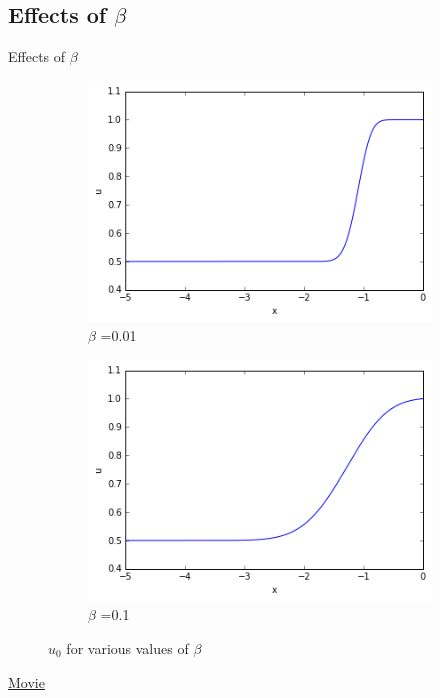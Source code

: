 \documentclass{beamer}
\begin{document}
\subsection{Effects of $\beta$}
\begin{frame}{Effects of $\beta$}
\begin{figure}[H]
	\centering
	\begin{subfigure}{.5\textwidth}
		\centering
		\includegraphics[width=\linewidth]{beta01}
		\caption{$\beta$ =0.01}
		\label{fig:sub1}
	\end{subfigure}%
	\begin{subfigure}{.5\textwidth}
		\centering
		\includegraphics[width=\linewidth]{beta1}
		\caption{$\beta$ =0.1}
		\label{fig:sub2}
	\end{subfigure}
	\caption{$u_0$ for various values of $\beta$}
\end{figure}
\href{https://www.youtube.com/watch?v=nmbc-g3oGao}{Movie}	
\end{frame}	
\end{document}

